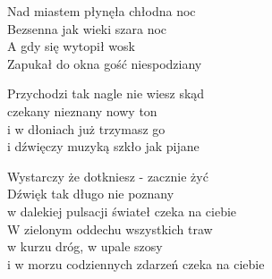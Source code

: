 
\begin{text}
    Nad miastem płynęła chłodna noc\\
    Bezsenna jak wieki szara noc\\
    A gdy się wytopił wosk\\
    Zapukał do okna gość niespodziany

    Przychodzi tak nagle nie wiesz skąd\\
    czekany nieznany nowy ton\\
    i w dłoniach już trzymasz go\\
    i dźwięczy muzyką szkło jak pijane

    Wystarczy że dotkniesz - zacznie żyć\\
    Dźwięk tak długo nie poznany\\
    w dalekiej pulsacji świateł czeka na ciebie\\
    W zielonym oddechu wszystkich traw\\
    w kurzu dróg, w upale szosy\\
    i w morzu codziennych zdarzeń czeka na ciebie
\end{text}
\begin{chord}

\end{chord}